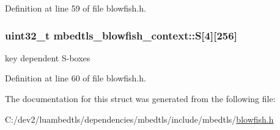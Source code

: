 Definition at line 59 of file blowfish.\-h.

\hypertarget{structmbedtls__blowfish__context_ab366ec526d9d5303483ed9c5bbb6a049}{
\subsubsection[{S}]{\setlength{\rightskip}{0pt plus 5cm}uint32\-\_\-t mbedtls\-\_\-blowfish\-\_\-context\-::\-S\mbox{[}4\mbox{]}\mbox{[}256\mbox{]}}}\label{structmbedtls__blowfish__context_ab366ec526d9d5303483ed9c5bbb6a049}
key dependent S-\/boxes 

Definition at line 60 of file blowfish.\-h.



The documentation for this struct was generated from the following file\-:\begin{DoxyCompactItemize}
\item 
C\-:/dev2/luambedtls/dependencies/mbedtls/include/mbedtls/\hyperlink{blowfish_8h}{blowfish.\-h}\end{DoxyCompactItemize}
